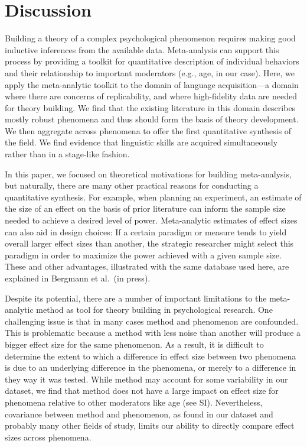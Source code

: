 \documentclass[english,floatsintext,man]{apa6}
\theoremstyle{definition}
\theoremstyle{definition}
\theoremstyle{remark}
\begin{document}
\section{Discussion}\label{discussion}

Building a theory of a complex psychological phenomenon requires making
good inductive inferences from the available data. Meta-analysis can
support this process by providing a toolkit for quantitative description
of individual behaviors and their relationship to important moderators
(e.g., age, in our case). Here, we apply the meta-analytic toolkit to
the domain of language acquisition---a domain where there are concerns
of replicability, and where high-fidelity data are needed for theory
building. We find that the existing literature in this domain describes
mostly robust phenomena and thus should form the basis of theory
development. We then aggregate across phenomena to offer the first
quantitative synthesis of the field. We find evidence that linguistic
skills are acquired simultaneously rather than in a stage-like fashion.

In this paper, we focused on theoretical motivations for building
meta-analysis, but naturally, there are many other practical reasons for
conducting a quantitative synthesis. For example, when planning an
experiment, an estimate of the size of an effect on the basis of prior
literature can inform the sample size needed to achieve a desired level
of power. Meta-analytic estimates of effect sizes can also aid in design
choices: If a certain paradigm or measure tends to yield overall larger
effect sizes than another, the strategic researcher might select this
paradigm in order to maximize the power achieved with a given sample
size. These and other advantages, illustrated with the same database
used here, are explained in Bergmann et al.~(in press).

Despite its potential, there are a number of important limitations to
the meta-analytic method as tool for theory building in psychological
research. One challenging issue is that in many cases method and
phenomenon are confounded. This is problematic because a method with
less noise than another will produce a bigger effect size for the same
phenomenon. As a result, it is difficult to determine the extent to
which a difference in effect size between two phenomena is due to an
underlying difference in the phenomena, or merely to a difference in
they way it was tested. While method may account for some variability in
our dataset, we find that method does not have a large impact on effect
size for phenomena relative to other moderators like age (see SI).
Nevertheless, covariance between method and phenomenon, as found in our
dataset and probably many other fields of study, limits our ability to
directly compare effect sizes across phenomena.
\end{document}
